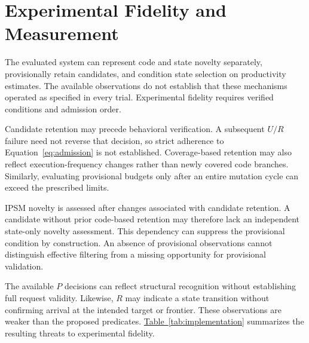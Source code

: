 \documentclass[final,5p,times,number]{elsarticle}
\newcommand{\namedref}[2]{\hyperref[#2]{#1~\ref*{#2}}}
\begin{document}
\section{Experimental Fidelity and Measurement}
\label{sec:implementation}
The evaluated system can represent code and state novelty separately, provisionally retain candidates, and condition state selection on productivity estimates. The available observations do not establish that these mechanisms operated as specified in every trial. Experimental fidelity requires verified conditions and admission order.

Candidate retention may precede behavioral verification. A subsequent $U/R$ failure need not reverse that decision, so strict adherence to Equation~\ref{eq:admission} is not established. Coverage-based retention may also reflect execution-frequency changes rather than newly covered code branches. Similarly, evaluating provisional budgets only after an entire mutation cycle can exceed the prescribed limits.

IPSM novelty is assessed after changes associated with candidate retention. A candidate without prior code-based retention may therefore lack an independent state-only novelty assessment. This dependency can suppress the provisional condition by construction. An absence of provisional observations cannot distinguish effective filtering from a missing opportunity for provisional validation.

The available $P$ decisions can reflect structural recognition without establishing full request validity. Likewise, $R$ may indicate a state transition without confirming arrival at the intended target or frontier. These observations are weaker than the proposed predicates. \namedref{Table}{tab:implementation} summarizes the resulting threats to experimental fidelity.
\end{document}
